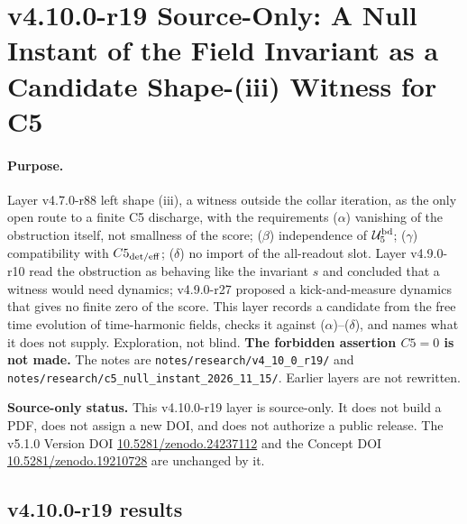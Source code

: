 
\clearpage
\section*{v4.10.0-r19 Source-Only: A Null Instant of the Field Invariant as a Candidate Shape-(iii) Witness for C5}
\label{sec:v4100-r19-c5-null-instant}

\paragraph{Purpose.}
Layer v4.7.0-r88 left shape (iii), a witness outside the collar iteration, as the only open route to a finite C5 discharge, with
the requirements (\(\alpha\)) vanishing of the obstruction itself, not smallness of the score; (\(\beta\)) independence of
\(\mathcal U_5^{\rm bd}\); (\(\gamma\)) compatibility with \(C5_{\rm det/eff}\); (\(\delta\)) no import of the all-readout slot.  Layer
v4.9.0-r10 read the obstruction as behaving like the invariant \(s\) and concluded that a witness would need dynamics; v4.9.0-r27
proposed a kick-and-measure dynamics that gives no finite zero of the score.  This layer records a candidate from the free time
evolution of time-harmonic fields, checks it against (\(\alpha\))--(\(\delta\)), and names what it does not supply.  Exploration, not
blind.  \textbf{The forbidden assertion \(C5=0\) is not made.}  The notes are
\texttt{notes/\allowbreak research/\allowbreak v4\_10\_0\_r19/} and
\texttt{notes/\allowbreak research/\allowbreak c5\_null\_instant\_2026\_11\_15/}.  Earlier layers are not rewritten.

\noindent\textbf{Source-only status.}
This v4.10.0-r19 layer is source-only.  It does not build a PDF, does not assign a new DOI,
and does not authorize a public release.  The v5.1.0 Version DOI
\href{https://doi.org/10.5281/zenodo.24237112}{10.5281/zenodo.24237112} and the Concept DOI
\href{https://doi.org/10.5281/zenodo.19210728}{10.5281/zenodo.19210728} are unchanged by it.

\subsection*{v4.10.0-r19 results}
\label{subsec:v4100-r19-results}

